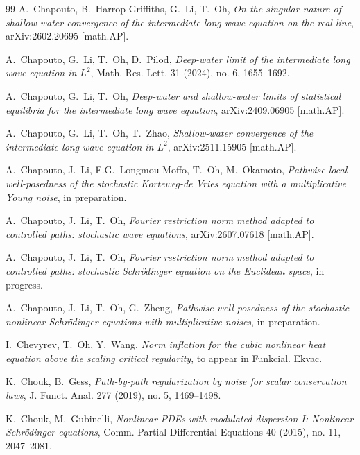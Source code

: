 \documentclass[letterpaper, 11pt,  reqno]{amsart}
\newcommand{\1}{\hspace{0.5mm}\text{I}\hspace{0.5mm}}
\numberwithin{equation}{section}
\numberwithin{theorem}{section}
\begin{document}
\begin{thebibliography}{99}
A.~Chapouto, B.~Harrop-Griffiths, G.~Li, T.~Oh,
{\it 
On the singular nature of shallow-water convergence of the intermediate long wave equation on the real line},
arXiv:2602.20695 [math.AP].


A.~Chapouto, G.~Li, T.~Oh, D.~Pilod,
{\it Deep-water limit of the intermediate long wave equation in $L^2$},
Math. Res. Lett.
 31 (2024), no. 6, 1655--1692. 



A.~Chapouto, G.~Li, T.~Oh, 
{\it
Deep-water and shallow-water limits
of statistical equilibria
for the intermediate long wave equation}, 
arXiv:2409.06905 [math.AP].



A.~Chapouto, G.~Li, T.~Oh, T.~Zhao, 
{\it
Shallow-water convergence of the intermediate long wave equation in $L^2$}, 
arXiv:2511.15905 [math.AP].




A.~Chapouto, J.~Li,
F.G.~Longmou-Moffo, 
 T.~Oh, M.~Okamoto,
{\it Pathwise local well-posedness of the stochastic Korteweg-de Vries equation with a multiplicative Young noise}, in preparation. 


A.~Chapouto, J.~Li, T.~Oh, 
{\it  Fourier restriction norm method adapted to controlled paths: stochastic wave equations},
arXiv:2607.07618 [math.AP].



A.~Chapouto, J.~Li, T.~Oh, 
{\it  Fourier restriction norm method adapted to controlled paths: stochastic
Schr\"odinger equation on the Euclidean space},
in progress.







A.~Chapouto, J.~Li, T.~Oh, G.~Zheng,
{\it  Pathwise well-posedness of the stochastic nonlinear Schr\"odinger equations with multiplicative noises},
in preparation.



I.~Chevyrev, T.~Oh, Y.~Wang, 
{\it 
Norm inflation for the cubic nonlinear heat equation above the scaling critical regularity}, 
to appear in Funkcial. Ekvac.

K.~Chouk, B.~Gess, 
{\it Path-by-path regularization by noise for scalar conservation laws}, 
J. Funct. Anal. 277 (2019), no. 5, 1469--1498. 




K.~Chouk, M.~Gubinelli, 
{\it Nonlinear PDEs with modulated dispersion I: Nonlinear Schr\"odinger equations},
Comm. Partial Differential Equations 40 (2015), no. 11, 2047--2081. 






\end{thebibliography}
\end{document}
